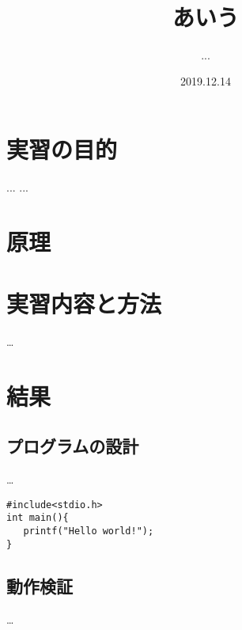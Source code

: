 \documentclass[11pt,a4paper]{jsarticle}
\title{　\\　\\　\\　\\　\\　\\　\\　\\　　\\あいう}
\author{...}
\date{2019.12.14}
\begin{document}
\maketitle
\newpage %
\section{実習の目的}
...
...
\section{原理}

\section{実習内容と方法}
…
\section{結果}
\subsection{プログラムの設計}
…

\begin{lstlisting}[caption=hoge,label=fuga]
#include<stdio.h>
int main(){
   printf("Hello world!");
}
\end{lstlisting}

\subsection{動作検証}
…
\end{document}
